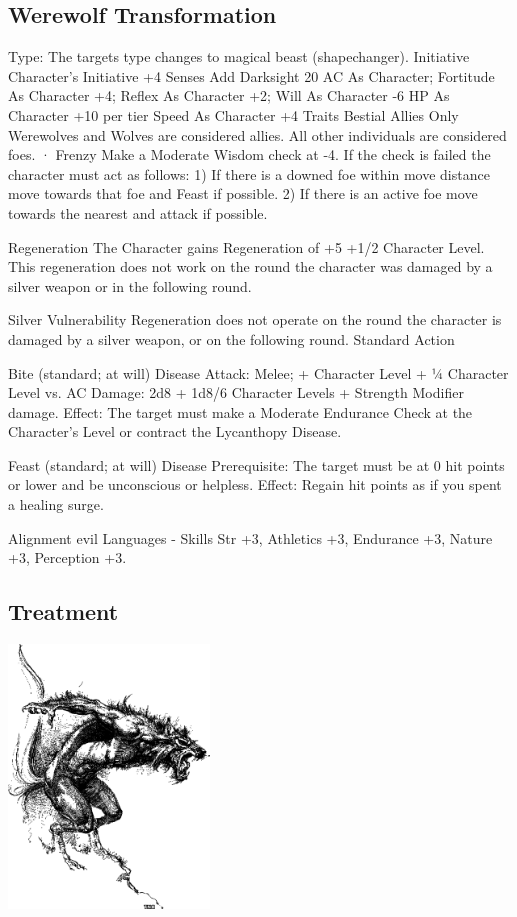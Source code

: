 \documentclass[a4paper]{dnd5}
\begin{document}
\subsection{Werewolf Transformation}


Type: The targets type changes to magical beast (shapechanger).
Initiative Character’s Initiative +4 Senses Add Darksight 20
AC As Character; Fortitude As Character +4; Reflex As Character +2; Will As Character -6
HP As Character +10 per tier
Speed As Character +4
Traits
         Bestial Allies
Only Werewolves and Wolves are considered allies. All other individuals are considered foes.
·         Frenzy
Make a Moderate Wisdom check at -4. If the check is failed the character must act as follows:
1)      If there is a downed foe within move distance move towards that foe and Feast if possible.
2)      If there is an active foe move towards the nearest and attack if possible.

         Regeneration
The Character gains Regeneration of +5 +1/2 Character Level. This regeneration does not work on the round the character was damaged by a silver weapon or in the following round.

         Silver Vulnerability
Regeneration does not operate on the round the character is damaged by a silver weapon, or on the following round.
Standard Action

         Bite (standard; at will) Disease
Attack: Melee; + Character Level + ¼ Character Level vs. AC
Damage: 2d8 + 1d8/6 Character Levels + Strength Modifier damage.
Effect: The target must make a Moderate Endurance Check at the Character’s Level or contract the Lycanthopy Disease.

         Feast (standard; at will) Disease 
Prerequisite: The target must be at 0 hit points or lower and be unconscious or helpless.
Effect: Regain hit points as if you spent a healing surge.

Alignment evil Languages - 
Skills Str +3, Athletics +3, Endurance +3, Nature +3, Perception +3.








\subsection{Treatment}

\begin{flushright}
 \includegraphics[width=0.4\textwidth]{werewolf.png}
\end{flushright}
\end{document}
